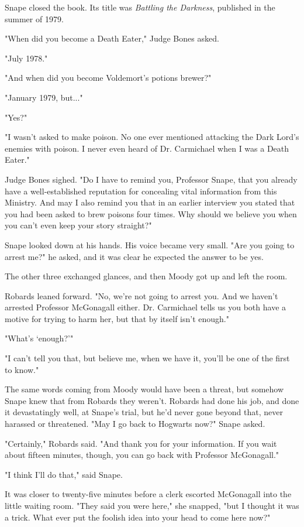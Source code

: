 \documentclass[a4paper,11pt]{article}
\begin{document}
Snape closed the book. Its title was \emph{Battling the Darkness}, published in the summer of 1979.

"When did you become a Death Eater," Judge Bones asked.

"July 1978."

"And when did you become Voldemort's potions brewer?"

"January 1979, but..."

"Yes?"

"I wasn't asked to make poison. No one ever mentioned attacking the Dark Lord's enemies with poison. I never even heard of Dr. Carmichael when I was a Death Eater."

Judge Bones sighed. "Do I have to remind you, Professor Snape, that you already have a well-established reputation for concealing vital information from this Ministry. And may I also remind you that in an earlier interview you stated that you had been asked to brew poisons four times. Why should we believe you when you can't even keep your story straight?"

Snape looked down at his hands. His voice became very small. "Are you going to arrest me?" he asked, and it was clear he expected the answer to be yes.

The other three exchanged glances, and then Moody got up and left the room.

Robards leaned forward. "No, we're not going to arrest you. And we haven't arrested Professor McGonagall either. Dr. Carmichael tells us you both have a motive for trying to harm her, but that by itself isn't enough."

"What's `enough?'"

"I can't tell you that, but believe me, when we have it, you'll be one of the first to know."

The same words coming from Moody would have been a threat, but somehow Snape knew that from Robards they weren't. Robards had done his job, and done it devastatingly well, at Snape's trial, but he'd never gone beyond that, never harassed or threatened. "May I go back to Hogwarts now?" Snape asked.

"Certainly," Robards said. "And thank you for your information. If you wait about fifteen minutes, though, you can go back with Professor McGonagall."

"I think I'll do that," said Snape.

It was closer to twenty-five minutes before a clerk escorted McGonagall into the little waiting room. "They said you were here," she snapped, "but I thought it was a trick. What ever put the foolish idea into your head to come here now?"
\end{document}
